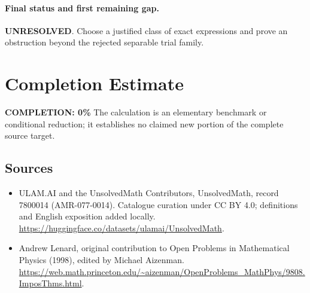 \documentclass[11pt]{article}
\begin{document}
\paragraph{Final status and first remaining gap.}
\textbf{UNRESOLVED}. Choose a justified class of exact expressions and prove an obstruction beyond the rejected separable trial family.

\section{Completion Estimate}
\noindent\textbf{COMPLETION: 0\%}
The calculation is an elementary benchmark or conditional reduction; it establishes no claimed new portion of the complete source target.

\subsection{Sources}
\begin{itemize}
\item[\hypertarget{source:7800014:1}{S1}] ULAM.AI and the UnsolvedMath Contributors, UnsolvedMath, record 7800014 (AMR-077-0014). Catalogue curation under CC BY 4.0; definitions and English exposition added locally.
\url{https://huggingface.co/datasets/ulamai/UnsolvedMath}.
\item[\hypertarget{source:7800014:2}{S2}] Andrew Lenard, original contribution to Open Problems in Mathematical Physics (1998), edited by Michael Aizenman.
\url{https://web.math.princeton.edu/~aizenman/OpenProblems_MathPhys/9808.ImposThms.html}.
\end{itemize}
\label{end:7800014}
\end{document}
